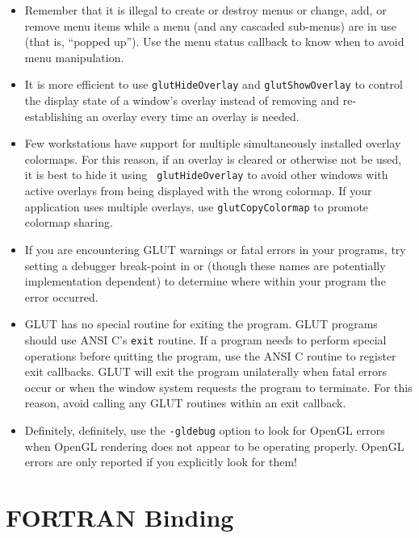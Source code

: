 \documentclass[titlepage,twoside]{article}
\begin{document}
\begin{itemize}
\item
Remember that it is illegal to create or destroy menus or change, add, or
remove menu items while a menu (and any cascaded sub-menus) are in use
(that is, ``popped up'').  Use the menu status callback to know when to
avoid menu manipulation.

\item
It is more efficient to use {\tt glutHideOverlay} and {\tt glutShowOverlay}
to control the display state of a window's overlay instead of removing
and re-establishing an overlay every time an overlay is needed.

\item
Few workstations have support for multiple simultaneously installed
overlay colormaps.  For this reason, if an overlay is cleared or
otherwise not be used, it is best to hide it using {\tt
glutHideOverlay} to avoid other windows with active overlays from being
displayed with the wrong colormap.  If your application uses multiple
overlays, use {\tt glutCopyColormap} to promote colormap sharing.

\item
If you are encountering GLUT warnings or fatal errors in your programs,
try setting a debugger break-point in  or
 (though these names are potentially
implementation dependent) to determine where within your program the
error occurred.

\item
GLUT has no special routine for exiting the program.  GLUT programs
should use ANSI C's {\tt exit} routine.  If a program needs
to perform special operations before quitting the program, use
the ANSI C  routine to register exit callbacks.  GLUT
will exit the program unilaterally when fatal errors occur or
when the window system requests the program to terminate.  For
this reason, avoid calling any GLUT routines within an exit
callback.

\item
Definitely, definitely, use the {\tt -gldebug} option to look
for OpenGL errors when OpenGL rendering does not appear to
be operating properly.  OpenGL errors are only reported if
you explicitly look for them!

\end{itemize}

\section{FORTRAN Binding}
\end{document}
